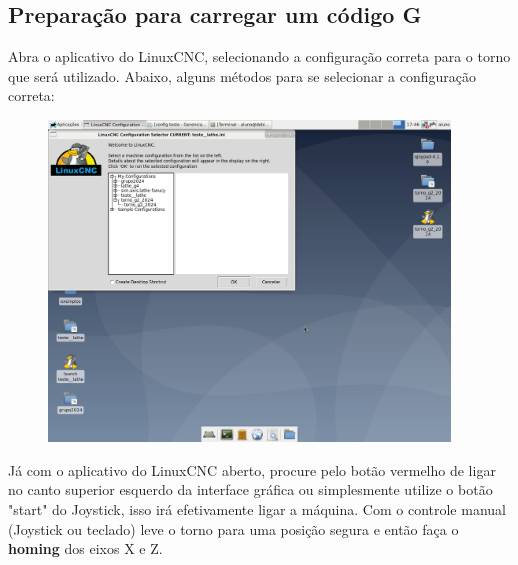 \documentclass[twoside,a4paper]{refart}
\begin{document}
\subsection{Preparação para carregar um código G}
Abra o aplicativo do LinuxCNC, selecionando a configuração correta para o torno que será utilizado. Abaixo, alguns métodos para se selecionar a configuração correta:

\begin{figure}[H]
    \begin{center}
        \includegraphics[width=0.95\textwidth]{imagens/Abertura_do_linux_CNC.png}
    \end{center}
    \caption{}\label{abrircncpiorjeito}
\end{figure}

Já com o aplicativo do LinuxCNC aberto, procure pelo botão vermelho de ligar no canto superior esquerdo da interface gráfica ou simplesmente utilize o botão "start" do Joystick, isso irá efetivamente ligar a máquina. 
Com o controle manual (Joystick ou teclado) leve o torno para uma posição segura e então faça o \textbf{homing} dos eixos X e Z.
\end{document}
